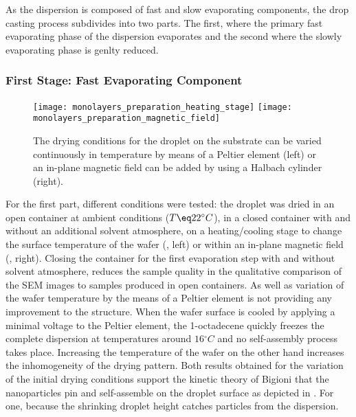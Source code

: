 \documentclass[\main/dresen_thesis.tex]{subfiles}
\begin{document}
  As the dispersion is composed of fast and slow evaporating components, the drop casting process subdivides into two parts.
  The first, where the primary fast evaporating phase of the dispersion evaporates and the second where the slowly evaporating phase is genlty reduced.

  \subsubsection{First Stage: Fast Evaporating Component}
    \begin{figure}[tb]
      \centering
      \texttt{[image: monolayers\_preparation\_heating\_stage]}
      \texttt{[image: monolayers\_preparation\_magnetic\_field]}
      \caption{\label{fig:monolayers:preparation:dryingConditions:varyConditions}The drying conditions for the droplet on the substrate can be varied continuously in temperature by means of a Peltier element (left) or an in-plane magnetic field can be added by using a Halbach cylinder (right).}
    \end{figure}  
    For the first part, different conditions were tested: the droplet was dried in an open container at ambient conditions ($T \eq 22 ^\circ C$), in a closed container with and without an additional solvent atmosphere, on a heating/cooling stage to change the surface temperature of the wafer (, left) or within an in-plane magnetic field (, right).
    Closing the container for the first evaporation step with and without solvent atmosphere, reduces the sample quality in the qualitative comparison of the SEM images to samples produced in open containers.
    As well as variation of the wafer temperature by the means of a Peltier element is not providing any improvement to the structure.
    When the wafer surface is cooled by applying a minimal voltage to the Peltier element, the 1-octadecene quickly freezes the complete dispersion at temperatures around $16 \unit{^\circ C}$ and no self-assembly process takes place.
    Increasing the temperature of the wafer on the other hand increases the inhomogeneity of the drying pattern.
    Both results obtained for the variation of the initial drying conditions support the kinetic theory of Bigioni \etal \cite{Bigioni_2006_Kinet} that the nanoparticles pin and self-assemble on the droplet surface as depicted in .
    For one, because the shrinking droplet height catches particles from the dispersion.
\end{document}
